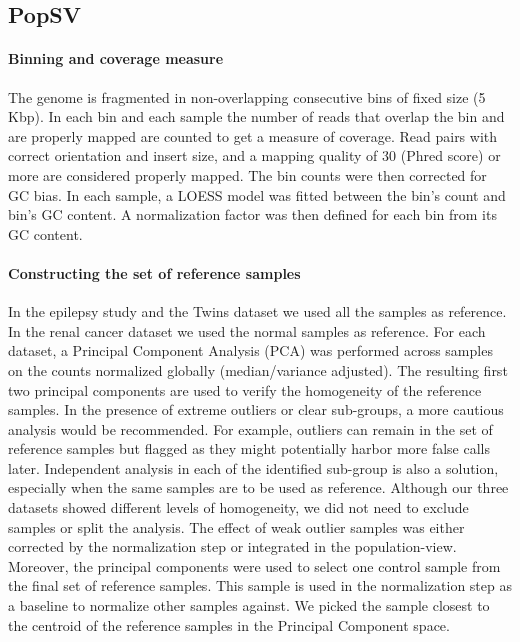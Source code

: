 \subsection*{{\sf PopSV}}

\paragraph{Binning and coverage measure}
The genome is fragmented in non-overlapping consecutive bins of fixed size (5 Kbp). In each bin and each sample the number of reads that overlap the bin and are properly mapped are counted to get a measure of coverage. Read pairs with correct orientation and insert size, and a mapping quality of 30 (Phred score) or more are considered properly mapped. The bin counts were then corrected for GC bias. In each sample, a LOESS model was fitted between the bin's count and bin's GC content. A normalization factor was then defined for each bin from its GC content.

\paragraph{Constructing the set of reference samples}
In the epilepsy study and the Twins dataset we used all the samples as reference. In the renal cancer dataset we used the normal samples as reference. For each dataset, a Principal Component Analysis (PCA) was performed across samples on the counts normalized globally (median/variance adjusted). The resulting first two principal components are used to verify the homogeneity of the reference samples.
In the presence of extreme outliers or clear sub-groups, a more cautious analysis would be recommended. For example, outliers can remain in the set of reference samples but flagged as they might potentially harbor more false calls later. Independent analysis in each of the identified sub-group is also a solution, especially when the same samples are to be used as reference.
Although our three datasets showed different levels of homogeneity, we did not need to exclude samples or split the analysis. The effect of weak outlier samples was either corrected by the normalization step or integrated in the population-view. Moreover, the principal components were used to select one control sample from the final set of reference samples. This sample is used in the normalization step as a baseline to normalize other samples against. We picked the sample closest to the centroid of the reference samples in the Principal Component space.

